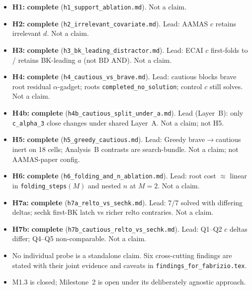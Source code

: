 \documentclass[11pt]{article}
\begin{document}
\begin{itemize}
  \item \textbf{H1:} \textbf{complete} (\texttt{h1\_support\_ablation.md}).
    Not a claim.
  \item \textbf{H2:} \textbf{complete} (\texttt{h2\_irrelevant\_covariate.md}).
    Lead: AAMAS \(c\) retains irrelevant \(d\). Not a claim.
  \item \textbf{H3:} \textbf{complete} (\texttt{h3\_bk\_leading\_distractor.md}).
    Lead: ECAI \(c\) first-folds to / retains BK-leading \(a\) (not BD AND).
    Not a claim.
  \item \textbf{H4:} \textbf{complete} (\texttt{h4\_cautious\_vs\_brave.md}).
    Lead: cautious blocks brave root residual $\alpha$-gadget; roots
    \texttt{completed\_no\_solution}; control \(c\) still solves. Not a claim.
  \item \textbf{H4b:} \textbf{complete}
    (\texttt{h4b\_cautious\_split\_under\_a.md}).
    Lead (Layer~B): only \texttt{c\_alpha\_3} close changes under shared
    Layer~A. Not a claim; not H5.
  \item \textbf{H5:} \textbf{complete} (\texttt{h5\_greedy\_cautious.md}).
    Lead: Greedy brave$\to$cautious inert on 18 cells; Analysis~B contrasts
    are search-bundle. Not a claim; not AAMAS-paper config.
  \item \textbf{H6:} \textbf{complete} (\texttt{h6\_folding\_and\_n\_ablation.md}).
    Lead: root cost $\approx$ linear in \texttt{folding\_steps}$(M)$ and nested $n$
    at $M{=}2$. Not a claim.
  \item \textbf{H7a:} \textbf{complete} (\texttt{h7a\_relto\_vs\_sechk.md}).
    Lead: 7/7 solved with differing deltas; sechk first-BK latch vs richer
    relto contraries. Not a claim.
  \item \textbf{H7b:} \textbf{complete} (\texttt{h7b\_cautious\_relto\_vs\_sechk.md}).
    Lead: Q1--Q2 $c$ deltas differ; Q4--Q5 non-comparable. Not a claim.
  \item No individual probe is a standalone claim. Six cross-cutting findings
    are stated with their joint evidence and caveats in
    \texttt{findings\_for\_fabrizio.tex}.
  \item M1.3 is closed; Milestone~2 is open under its deliberately agnostic approach.
\end{itemize}
\end{document}
